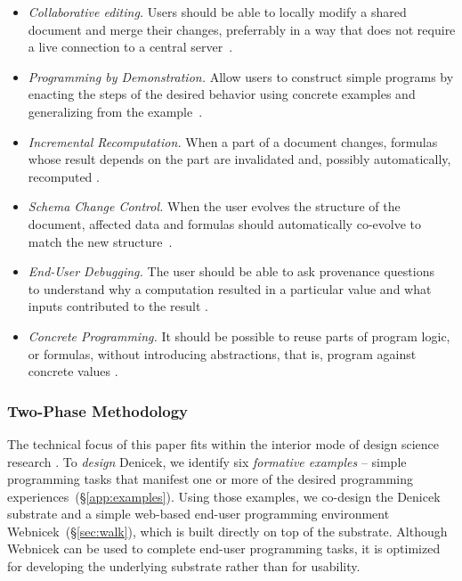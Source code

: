 \documentclass[sigconf,anonymous,screen]{acmart}
\begin{document}
\begin{itemize}
\item \emph{Collaborative editing.} Users should be able to locally modify a shared document
  and merge their changes, preferrably in a way that does not require a live connection to a central server~\cite{kleppmann-2019-local}.
\item \emph{Programming by Demonstration.} Allow users to construct simple programs by
  enacting the steps of the desired behavior using concrete examples and generalizing from the example~\cite{leiva-2021-rapido,cypher-1993-pbd}.
\item \emph{Incremental Recomputation.} When a part of a document changes, formulas whose result
  depends on the part are invalidated and, possibly automatically, recomputed \cite{teitelbaum-1981-cps,mcdirmid-2013-usable,horowitz-2023-engraft}.
\item \emph{Schema Change Control.} When the user evolves the structure of the document, affected
  data and formulas should automatically co-evolve to match the new structure~\cite{litt-2020-cambria,edwards-2025-schema}.
\item \emph{End-User Debugging.} The user should be able to ask provenance questions~\cite{cheney-2009-provenance} to understand
  why a computation resulted in a particular value and what inputs contributed to the result \cite{ko-2009-whyline}.
\item \emph{Concrete Programming.} It should be possible to reuse parts of program logic, or formulas,
  without introducing abstractions, that is, program against concrete values \cite{edwards-2006-copypaste,edwards-2022-copypaste}.
\end{itemize}

\subsubsection*{Two-Phase Methodology}
The technical focus of this paper fits within the interior mode of design science research \cite{adam-2021-dsr}.
To \emph{design} Denicek, we identify six \emph{formative examples} -- simple programming
tasks that manifest one or more of the desired programming experiences~(\S\ref{app:examples}).
Using those examples, we co-design the Denicek substrate and a simple web-based end-user programming
environment Webnicek~(\S\ref{sec:walk}), which is built directly on top of the substrate. Although
Webnicek can be used to complete end-user programming tasks, it is optimized for developing the
underlying substrate rather than for usability.
\end{document}
